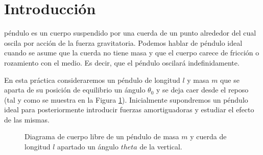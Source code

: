 \documentclass[journal]{IEEEtran}
\begin{document}
\section{Introducción}

 péndulo es un cuerpo suspendido por una cuerda de un punto alrededor del cual oscila por acción de la fuerza gravitatoria. Podemos hablar de péndulo ideal cuando se asume que la cuerda no tiene masa y que el cuerpo carece de fricción o rozamiento con el medio. Es decir, que el péndulo oscilará indefinidamente.

En esta práctica consideraremos un péndulo de longitud $l$ y masa $m$ que se aparta de su posición de equilibrio un ángulo $\theta_0$ y se deja caer desde el reposo (tal y como se muestra en la Figura \ref{fig:pendulum}). Inicialmente supondremos un péndulo ideal para posteriormente introducir fuerzas amortiguadoras y estudiar el efecto de las mismas.

\begin{figure}[!hbt]
  \centering
{}
  \caption{Diagrama de cuerpo libre de un péndulo de masa $m$ y cuerda de longitud $l$ apartado un ángulo $theta$ de la vertical.}
  \label{fig:pendulum}
\end{figure}
\end{document}
